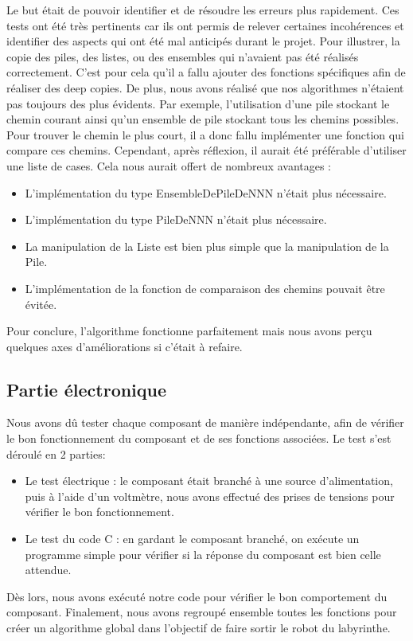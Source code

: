             Le but était de pouvoir identifier et de résoudre les erreurs plus rapidement. Ces tests ont été très pertinents car ils ont permis de relever certaines incohérences et identifier des aspects qui ont été mal anticipés durant le projet. Pour illustrer, la copie des piles, des listes, ou des ensembles qui n'avaient pas été réalisés correctement. C'est pour cela qu'il a fallu ajouter des fonctions spécifiques afin de réaliser des deep copies. De plus, nous avons réalisé que nos algorithmes n'étaient pas toujours des plus évidents. Par exemple, l'utilisation d'une pile stockant le chemin courant ainsi qu'un ensemble de pile stockant tous les chemins possibles. Pour trouver le chemin le plus court, il a donc fallu implémenter une fonction qui compare ces chemins. Cependant, après réflexion, il aurait été préférable d'utiliser une liste de cases. Cela nous aurait offert de nombreux avantages :
            \vspace{0.1mm}
            \begin{itemize}
            \item L'implémentation du type EnsembleDePileDeNNN n'était plus nécessaire.
            \item L'implémentation du type PileDeNNN n'était plus nécessaire.
            \item La manipulation de la Liste est bien plus simple que la manipulation de la Pile.
            \item L'implémentation de la fonction de comparaison des chemins pouvait être évitée.
            \end{itemize}

            Pour conclure, l'algorithme fonctionne parfaitement mais nous avons perçu quelques axes d'améliorations si c'était à refaire.

            \vspace{2mm}

        \subsection{Partie électronique}
            Nous avons dû tester chaque composant de manière indépendante, afin de vérifier le bon fonctionnement du composant et de ses fonctions associées. Le test s'est déroulé en 2 parties: 
            \begin{itemize}
                \item Le test électrique : le composant était branché à une source d'alimentation, puis à l'aide d'un voltmètre, nous avons effectué des prises de tensions pour vérifier le bon fonctionnement.
                \item Le test du code C : en gardant le composant branché, on exécute un programme simple pour vérifier si la réponse du composant est bien celle attendue. 
            \end{itemize}
            Dès lors, nous avons exécuté notre code pour vérifier le bon comportement du composant. Finalement, nous avons regroupé ensemble toutes les fonctions pour créer un algorithme global dans l'objectif de faire sortir le robot du labyrinthe.\\

